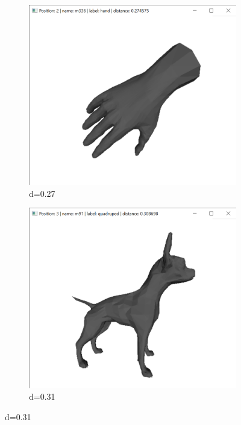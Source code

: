 \documentclass{bigdata}
\begin{document}
\begin{figure}[h!]
\begin{subfigure}[b]{0.09\linewidth}
  \end{subfigure}
  \begin{subfigure}[b]{0.09\linewidth}
    \includegraphics[width=\linewidth]{Pictures/Evaluation/m92/pos2.png}
    \caption*{d=0.27}
  \end{subfigure}
  \begin{subfigure}[b]{0.09\linewidth}
    \includegraphics[width=\linewidth]{Pictures/Evaluation/m92/pos3.png}
    \caption*{d=0.31}
  \end{subfigure}

\end{figure}
\end{document}
